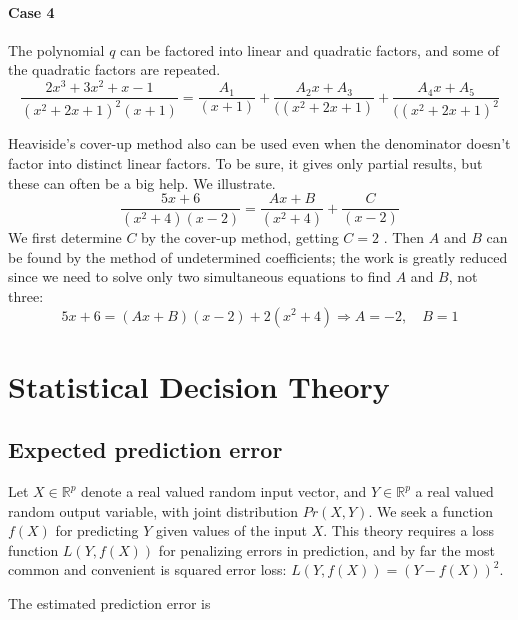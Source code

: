 \documentclass[12pt, letterpaper]{article}
\theoremstyle{definition}
\newcommand{\R}{\mathbb{R}}
\let\tb\textbf
\begin{document}
\paragraph{\tb{Case 4}}The polynomial $q$ can be factored into linear and quadratic factors, and some of the quadratic factors are repeated.
\begin{equation}
\frac{2x^3 + 3x^2+x-1}{(x^2+2x+1)^2(x+1)} = \frac{A_1}{(x+1)}+\frac{A_2x +A_3}{((x^2+2x+1)}+\frac{A_4x +A_5}{((x^2+2x+1)^2}
\end{equation}


Heaviside's cover-up method also can be used even when the denominator doesn't factor into distinct linear factors. To be sure, it gives only partial results, but these can often be a big help. We illustrate.
\begin{equation*}
\frac{5x+6}{(x^2+4)(x-2)} = \frac{Ax+B}{(x^2+4)} +\frac{C}{(x-2)} 
\end{equation*}
We first determine $C$ by the cover-up method, getting $C = 2$ . Then $A$ and $B$ can be found by the method of undetermined coefficients; the work is greatly reduced since we need to solve only two simultaneous equations to find $A$ and $B$, not three:
\begin{equation}
5x + 6 = (Ax + B)(x - 2) + 2(x^2 + 4)\Rightarrow A=-2, \quad B=1
\end{equation}




\newpage
\section{Statistical Decision Theory}
\subsection{Expected prediction error}
Let $X \in \R^p$ denote a real valued random input vector, and $Y \in \R^p$ a real valued random output variable, with joint distribution $Pr(X,Y)$. We seek a function $f(X)$ for predicting $Y$ given values of the input $X$. This theory requires a loss function $L(Y,f(X))$ for penalizing errors in prediction, and by far the most common and convenient is 
squared error loss: $L(Y,f(X))=(Y -f(X))^2$.

The estimated prediction error is 
\end{document}
